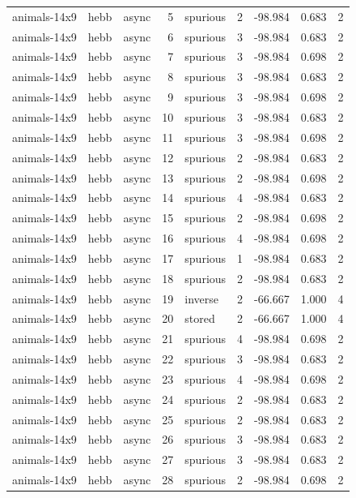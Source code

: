 \begin{tabular}{lllrlrrrr}
animals-14x9 & hebb & async & 5 & spurious & 2 & -98.984 & 0.683 & 2 \\
animals-14x9 & hebb & async & 6 & spurious & 3 & -98.984 & 0.683 & 2 \\
animals-14x9 & hebb & async & 7 & spurious & 3 & -98.984 & 0.698 & 2 \\
animals-14x9 & hebb & async & 8 & spurious & 3 & -98.984 & 0.683 & 2 \\
animals-14x9 & hebb & async & 9 & spurious & 3 & -98.984 & 0.698 & 2 \\
animals-14x9 & hebb & async & 10 & spurious & 3 & -98.984 & 0.683 & 2 \\
animals-14x9 & hebb & async & 11 & spurious & 3 & -98.984 & 0.698 & 2 \\
animals-14x9 & hebb & async & 12 & spurious & 2 & -98.984 & 0.683 & 2 \\
animals-14x9 & hebb & async & 13 & spurious & 2 & -98.984 & 0.698 & 2 \\
animals-14x9 & hebb & async & 14 & spurious & 4 & -98.984 & 0.683 & 2 \\
animals-14x9 & hebb & async & 15 & spurious & 2 & -98.984 & 0.698 & 2 \\
animals-14x9 & hebb & async & 16 & spurious & 4 & -98.984 & 0.698 & 2 \\
animals-14x9 & hebb & async & 17 & spurious & 1 & -98.984 & 0.683 & 2 \\
animals-14x9 & hebb & async & 18 & spurious & 2 & -98.984 & 0.683 & 2 \\
animals-14x9 & hebb & async & 19 & inverse & 2 & -66.667 & 1.000 & 4 \\
animals-14x9 & hebb & async & 20 & stored & 2 & -66.667 & 1.000 & 4 \\
animals-14x9 & hebb & async & 21 & spurious & 4 & -98.984 & 0.698 & 2 \\
animals-14x9 & hebb & async & 22 & spurious & 3 & -98.984 & 0.683 & 2 \\
animals-14x9 & hebb & async & 23 & spurious & 4 & -98.984 & 0.698 & 2 \\
animals-14x9 & hebb & async & 24 & spurious & 2 & -98.984 & 0.683 & 2 \\
animals-14x9 & hebb & async & 25 & spurious & 2 & -98.984 & 0.683 & 2 \\
animals-14x9 & hebb & async & 26 & spurious & 3 & -98.984 & 0.683 & 2 \\
animals-14x9 & hebb & async & 27 & spurious & 3 & -98.984 & 0.683 & 2 \\
animals-14x9 & hebb & async & 28 & spurious & 2 & -98.984 & 0.698 & 2 \\

\end{tabular}
